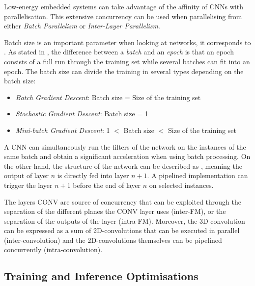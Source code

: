 Low-energy embedded systems can take advantage of the affinity of CNNs with parallelisation. This extensive concurrency can be used when parallelising from either \emph{Batch Parallelism} or \emph{Inter-Layer Parallelism}.

Batch size is an important parameter when looking at networks, it corresponds to  \cite{MLMastery2019}. As stated in \cite{MLMastery2019}, the difference between a \emph{batch} and an \emph{epoch} is that an epoch consists of a full run through the training set while several batches can fit into an epoch. The batch size can divide the training in several types depending on the batch size:

\begin{itemize}
	\item \emph{Batch Gradient Descent}: Batch size = Size of the training set
	\item \emph{Stochastic Gradient Descent}: Batch size = 1
	\item \emph{Mini-batch Gradient Descent}: 1 $<$ Batch size $<$ Size of the training set
\end{itemize}

A CNN can simultaneously run the filters of the network on the instances of the same batch and obtain a significant acceleration when using batch processing. On the other hand, the structure of the network can be described as , meaning the output of layer $n$ is directly fed into layer $n+1$. A pipelined implementation can trigger the layer $n+1$ before the end of layer $n$ on selected instances.

The layers CONV are source of concurrency that can be exploited through the separation of the different planes the CONV layer uses (inter-FM), or the separation of the outputs of the layer (intra-FM). Moreover, the 3D-convolution can be expressed as a sum of 2D-convolutions that can be executed in parallel (inter-convolution) and the 2D-convolutions themselves can be pipelined concurrently (intra-convolution).


\subsection{Training and Inference Optimisations}

